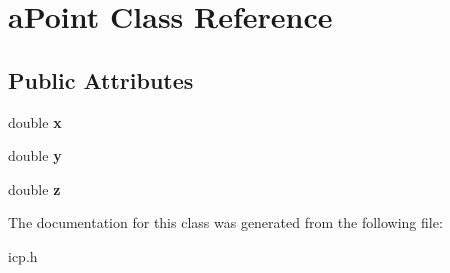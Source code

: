 \hypertarget{classaPoint}{}\section{a\+Point Class Reference}
\label{classaPoint}
\subsection*{Public Attributes}
\begin{DoxyCompactItemize}
\item 
\mbox{\label{classaPoint_af1ef5dd62d225d264aceeb0728ac0ba7}} 
double {\bfseries x}
\item 
\mbox{\label{classaPoint_aa8c73634208dd93e5572ca15e546ad39}} 
double {\bfseries y}
\item 
\mbox{\label{classaPoint_a0e221ad7ffa17d0c1dedd3073194cdc0}} 
double {\bfseries z}
\end{DoxyCompactItemize}


The documentation for this class was generated from the following file\+:\begin{DoxyCompactItemize}
\item 
icp.\+h\end{DoxyCompactItemize}

